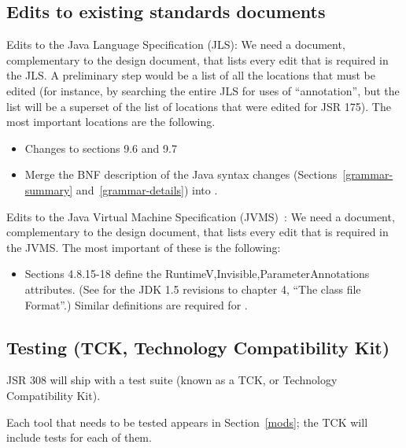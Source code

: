 \documentclass[10pt]{article}
\begin{document}
\subsection{Edits to existing standards documents}

Edits to the Java Language Specification (JLS):
      We need a document, complementary to the design document, that lists
      every edit that is required in the JLS.
      A preliminary step would be a list of all the locations that must be
      edited (for instance, by searching the entire JLS for uses of
      ``annotation'', but the list will be a superset of the list of
      locations that were edited for
      JSR 175).
      The most important locations are the following.
\begin{itemize}
\item
Changes to sections 9.6 and 9.7
\item
Merge the BNF description of the Java syntax changes
(Sections~\ref{grammar-summary} and~\ref{grammar-details})
into .
\end{itemize}

Edits to the Java Virtual Machine Specification (JVMS)~\cite{LindholmY99,LindholmY99:CFF5}:
      We need a document, complementary to the design document, that lists
      every edit that is required in the JVMS\@.
      The most important of these is the following:
\begin{itemize}
\item
        Sections 4.8.15-18 define the Runtime{V,Inv}isible{,Parameter}Annotations
        attributes.  (See
        for the JDK 1.5 revisions to chapter 4, ``The class file Format''.)
        Similar definitions are required for \RuntimeInOrVisibleTypeAnnotations.
\end{itemize}



\subsection{Testing (TCK, Technology Compatibility Kit)\label{testing}}

JSR 308 will ship with a test suite (known as a TCK, or Technology
Compatibility Kit).

Each tool that needs to be tested appears in Section~\ref{mods};
the TCK will include tests for each of them.
\end{document}
